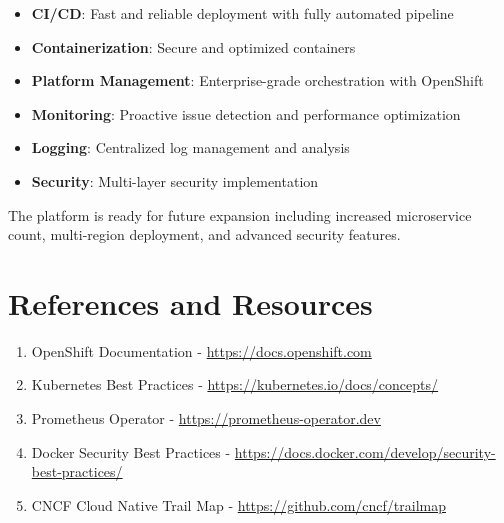 \documentclass[12pt,a4paper]{article}
\begin{document}
\begin{itemize}
    \item \textbf{CI/CD}: Fast and reliable deployment with fully automated pipeline
    \item \textbf{Containerization}: Secure and optimized containers
    \item \textbf{Platform Management}: Enterprise-grade orchestration with OpenShift
    \item \textbf{Monitoring}: Proactive issue detection and performance optimization
    \item \textbf{Logging}: Centralized log management and analysis
    \item \textbf{Security}: Multi-layer security implementation
\end{itemize}

The platform is ready for future expansion including increased microservice count, multi-region deployment, and advanced security features.

\section{References and Resources}

\begin{enumerate}
    \item OpenShift Documentation - \url{https://docs.openshift.com}
    \item Kubernetes Best Practices - \url{https://kubernetes.io/docs/concepts/}
    \item Prometheus Operator - \url{https://prometheus-operator.dev}
    \item Docker Security Best Practices - \url{https://docs.docker.com/develop/security-best-practices/}
    \item CNCF Cloud Native Trail Map - \url{https://github.com/cncf/trailmap}
\end{enumerate}
\end{document}
